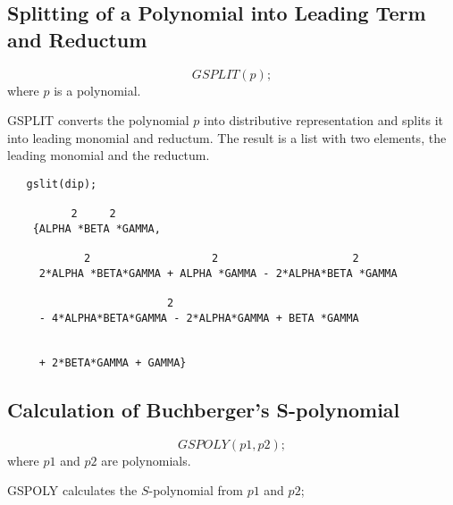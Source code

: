 \subsection{Splitting of a Polynomial into Leading Term and Reductum}
\[
GSPLIT (p);
\]
where $p$ is a polynomial.

GSPLIT converts the polynomial $p$ into distributive representation
and splits it into leading monomial and reductum. The result is a list
with two elements, the leading monomial and the reductum.

\begin{verbatim}
   gslit(dip);

          2     2
    {ALPHA *BETA *GAMMA,

            2                   2                     2
     2*ALPHA *BETA*GAMMA + ALPHA *GAMMA - 2*ALPHA*BETA *GAMMA

                         2
     - 4*ALPHA*BETA*GAMMA - 2*ALPHA*GAMMA + BETA *GAMMA


     + 2*BETA*GAMMA + GAMMA}

 \end{verbatim}


\subsection{Calculation of Buchberger's S-polynomial}
\[
GSPOLY (p1,p2);
\]
where $p1$  and $p2$ are polynomials.

GSPOLY calculates the $S$-polynomial from $p1$  and $p2$;

